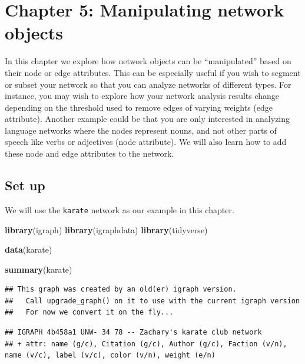 \documentclass[
]{book}
\newenvironment{Shaded}{\begin{snugshade}}{\end{snugshade}}
\newcommand{\FunctionTok}[1]{\textcolor[rgb]{0.13,0.29,0.53}{\textbf{#1}}}
\newcommand{\NormalTok}[1]{#1}
\newcommand{\StringTok}[1]{\textcolor[rgb]{0.31,0.60,0.02}{#1}}
\begin{document}
\chapter{Chapter 5: Manipulating network objects}\label{ch5}

In this chapter we explore how network objects can be ``manipulated'' based on their node or edge attributes. This can be especially useful if you wish to segment or subset your network so that you can analyze networks of different types. For instance, you may wish to explore how your network analysis results change depending on the threshold used to remove edges of varying weights (edge attribute). Another example could be that you are only interested in analyzing language networks where the nodes represent nouns, and not other parts of speech like verbs or adjectives (node attribute). We will also learn how to add these node and edge attributes to the network.

\section{Set up}\label{set-up}

We will use the \texttt{karate} network as our example in this chapter.

\begin{Shaded}
\begin{Highlighting}[]
\FunctionTok{library}\NormalTok{(igraph)}
\FunctionTok{library}\NormalTok{(igraphdata)}
\FunctionTok{library}\NormalTok{(tidyverse)}

\FunctionTok{data}\NormalTok{(}\StringTok{\textquotesingle{}karate\textquotesingle{}}\NormalTok{)}

\FunctionTok{summary}\NormalTok{(karate)}
\end{Highlighting}
\end{Shaded}

\begin{verbatim}
## This graph was created by an old(er) igraph version.
##   Call upgrade_graph() on it to use with the current igraph version
##   For now we convert it on the fly...
\end{verbatim}

\begin{verbatim}
## IGRAPH 4b458a1 UNW- 34 78 -- Zachary's karate club network
## + attr: name (g/c), Citation (g/c), Author (g/c), Faction (v/n), name (v/c), label (v/c), color (v/n), weight (e/n)
\end{verbatim}
\end{document}
